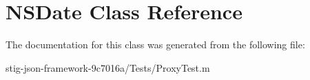 \hypertarget{class_n_s_date}{
\section{\-N\-S\-Date \-Class \-Reference}
\label{class_n_s_date}
}


\-The documentation for this class was generated from the following file\-:\begin{DoxyCompactItemize}
\item 
stig-\/json-\/framework-\/9c7016a/\-Tests/\-Proxy\-Test.\-m\end{DoxyCompactItemize}
